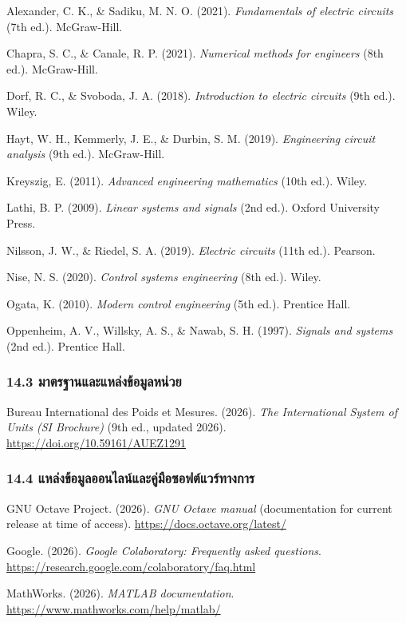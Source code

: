 Alexander, C. K., \& Sadiku, M. N. O. (2021). \textit{Fundamentals of electric circuits} (7th ed.). McGraw-Hill.

Chapra, S. C., \& Canale, R. P. (2021). \textit{Numerical methods for engineers} (8th ed.). McGraw-Hill.

Dorf, R. C., \& Svoboda, J. A. (2018). \textit{Introduction to electric circuits} (9th ed.). Wiley.

Hayt, W. H., Kemmerly, J. E., \& Durbin, S. M. (2019). \textit{Engineering circuit analysis} (9th ed.). McGraw-Hill.

Kreyszig, E. (2011). \textit{Advanced engineering mathematics} (10th ed.). Wiley.

Lathi, B. P. (2009). \textit{Linear systems and signals} (2nd ed.). Oxford University Press.

Nilsson, J. W., \& Riedel, S. A. (2019). \textit{Electric circuits} (11th ed.). Pearson.

Nise, N. S. (2020). \textit{Control systems engineering} (8th ed.). Wiley.

Ogata, K. (2010). \textit{Modern control engineering} (5th ed.). Prentice Hall.

Oppenheim, A. V., Willsky, A. S., \& Nawab, S. H. (1997). \textit{Signals and systems} (2nd ed.). Prentice Hall.

\subsubsection{14.3 มาตรฐานและแหล่งข้อมูลหน่วย}

Bureau International des Poids et Mesures. (2026). \textit{The International System of Units (SI Brochure)} (9th ed., updated 2026). \url{https://doi.org/10.59161/AUEZ1291}

\subsubsection{14.4 แหล่งข้อมูลออนไลน์และคู่มือซอฟต์แวร์ทางการ}

GNU Octave Project. (2026). \textit{GNU Octave manual} (documentation for current release at time of access). \url{https://docs.octave.org/latest/}

Google. (2026). \textit{Google Colaboratory: Frequently asked questions}. \url{https://research.google.com/colaboratory/faq.html}

MathWorks. (2026). \textit{MATLAB documentation}. \url{https://www.mathworks.com/help/matlab/}

